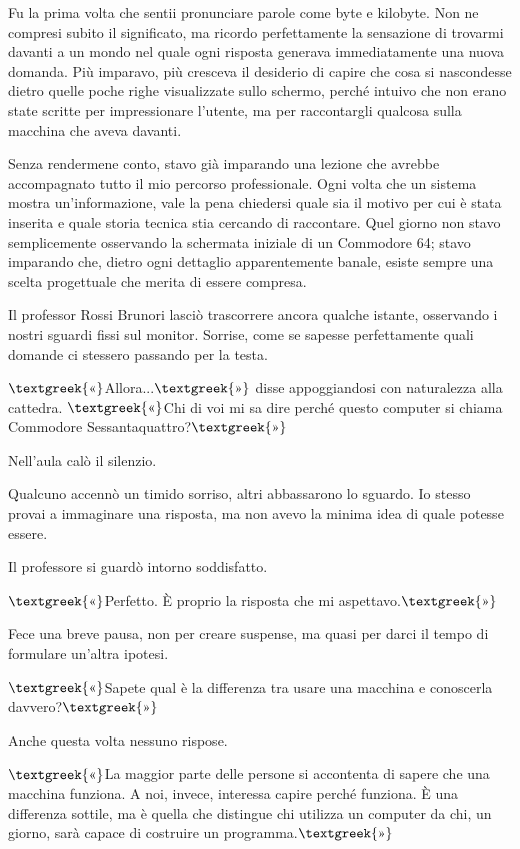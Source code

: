 \documentclass{article}
\begin{document}
Fu la prima volta che sentii pronunciare parole come byte e kilobyte. Non ne compresi subito il significato, ma ricordo
perfettamente la sensazione di trovarmi davanti a un mondo nel quale ogni risposta generava immediatamente una nuova
domanda. Più imparavo, più cresceva il desiderio di capire che cosa si nascondesse dietro quelle poche righe
visualizzate sullo schermo, perché intuivo che non erano state scritte per impressionare l'utente, ma per raccontargli
qualcosa sulla macchina che aveva davanti.

Senza rendermene conto, stavo già imparando una lezione che avrebbe accompagnato tutto il mio percorso professionale.
Ogni volta che un sistema mostra un'informazione, vale la pena chiedersi quale sia il motivo per cui è stata inserita e
quale storia tecnica stia cercando di raccontare. Quel giorno non stavo semplicemente osservando la schermata iniziale
di un Commodore 64; stavo imparando che, dietro ogni dettaglio apparentemente banale, esiste sempre una scelta
progettuale che merita di essere compresa.

Il professor Rossi Brunori lasciò trascorrere ancora qualche istante, osservando i nostri sguardi fissi sul monitor.
Sorrise, come se sapesse perfettamente quali domande ci stessero passando per la testa.

$\text{\textgreek{«}}$Allora...$\text{\textgreek{»}}$ disse appoggiandosi con naturalezza alla cattedra.
$\text{\textgreek{«}}$Chi di voi mi sa dire perché questo computer si chiama Commodore
Sessantaquattro?$\text{\textgreek{»}}$

Nell'aula calò il silenzio.

Qualcuno accennò un timido sorriso, altri abbassarono lo sguardo. Io stesso provai a immaginare una risposta, ma non
avevo la minima idea di quale potesse essere.

Il professore si guardò intorno soddisfatto.

$\text{\textgreek{«}}$Perfetto. È proprio la risposta che mi aspettavo.$\text{\textgreek{»}}$

Fece una breve pausa, non per creare suspense, ma quasi per darci il tempo di formulare un'altra ipotesi.

$\text{\textgreek{«}}$Sapete qual è la differenza tra usare una macchina e conoscerla davvero?$\text{\textgreek{»}}$

Anche questa volta nessuno rispose.

$\text{\textgreek{«}}$La maggior parte delle persone si accontenta di sapere che una macchina funziona. A noi, invece,
interessa capire perché funziona. È una differenza sottile, ma è quella che distingue chi utilizza un computer da chi,
un giorno, sarà capace di costruire un programma.$\text{\textgreek{»}}$
\end{document}
